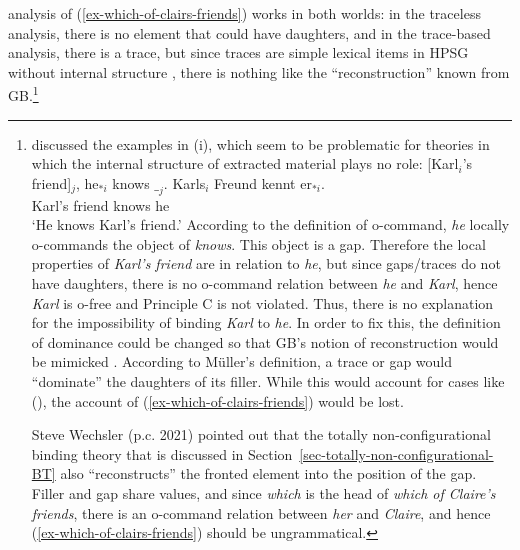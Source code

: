\documentclass[output=paper,biblatex,babelshorthands,newtxmath,draftmode,colorlinks,citecolor=brown]{langscibook}
\begin{document}
 analysis of (\ref{ex-which-of-clairs-friends}) works in both worlds: in the
traceless analysis, there is no element that could have daughters, and in the trace-based analysis,
there is a trace, but since traces are simple lexical items in HPSG without internal structure \citep[164]{ps2}, there
is nothing like the ``reconstruction'' known from GB.\footnote{
\citet[Section~20.2]{Mueller99a} discussed the examples in (i), which seem to be problematic for
theories in which the internal structure of extracted material plays no role:
\eal
\ex {}[Karl$_i$'s friend]$_j$, he$_{*i}$ knows $\__j$.
\ex 
\gll Karls$_i$ Freund kennt er$_{*i}$.\\
     Karl's    friend knows he\\
\glt `He knows Karl's friend.'
\zl
According to the definition of o-command, \emph{he} locally o-commands the object of
\emph{knows}. This object is a gap. Therefore the local properties of \emph{Karl's
  friend} are in relation to \emph{he}, but since gaps/traces do not have daughters, there is no o-command
relation between \emph{he} and \emph{Karl}, hence \emph{Karl} is o-free and Principle C is not
violated. Thus, there is no explanation for the impossibility of binding \emph{Karl} to \emph{he}. In
order to fix this, the definition of dominance could be changed so that GB's notion of
reconstruction would be mimicked \citep[--410]{Mueller99a}. According to Müller's definition, a trace or gap
would ``dominate'' the daughters of its filler. While this would account for cases like (),
the account of (\ref{ex-which-of-clairs-friends}) would be lost.

Steve Wechsler (p.c. 2021) pointed out that the totally non-configurational binding theory
that is discussed in Section~\ref{sec-totally-non-configurational-BT} also ``reconstructs'' the
fronted element into the position of the gap. Filler and gap share \local values, and since
\emph{which} is the head of \emph{which of Claire's friends}, there is an o-command relation between
\emph{her} and \emph{Claire}, and hence (\ref{ex-which-of-clairs-friends}) should be ungrammatical.

}
\end{document}

